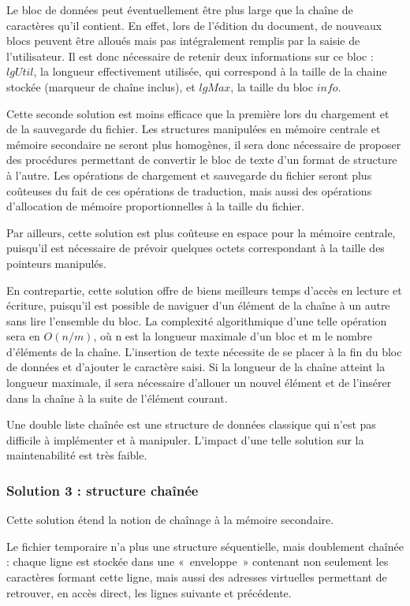 Le bloc de données peut éventuellement être plus large que la chaîne de
caractères qu'il contient. En effet, lors de l'édition du document, de nouveaux
blocs peuvent être alloués mais pas intégralement remplis par la saisie de
l'utilisateur. Il est donc nécessaire de retenir deux informations sur ce bloc
: $lgUtil$, la longueur effectivement utilisée, qui correspond à la taille de
la chaine stockée (marqueur de chaîne inclus),  et $lgMax$, la taille du bloc
$info$.

Cette seconde solution est moins efficace que la première lors du chargement et
de la sauvegarde du fichier. Les structures manipulées en mémoire centrale et
mémoire secondaire ne seront plus homogènes, il sera donc nécessaire de
proposer des procédures permettant de convertir le bloc de texte d'un format de
structure à l'autre. Les opérations de chargement et sauvegarde du fichier
seront plus coûteuses du fait de ces opérations de traduction, mais aussi des
opérations d'allocation de mémoire proportionnelles à la taille du fichier.

Par ailleurs, cette solution est plus coûteuse en espace pour la mémoire
centrale, puisqu'il est nécessaire de prévoir quelques octets correspondant à
la taille des pointeurs manipulés.

En contrepartie, cette solution offre de biens meilleurs temps d'accès en
lecture et écriture, puisqu'il est possible de naviguer d'un élément de la
chaîne à un autre sans lire l'ensemble du bloc. La complexité algorithmique
d'une telle opération sera en $O(n/m)$, où n est la longueur maximale d'un bloc
et m le nombre d'éléments de la chaîne. L'insertion de texte nécessite de se
placer à la fin du bloc de données et d'ajouter le caractère saisi. Si la
longueur de la chaîne atteint la longueur maximale, il sera nécessaire
d'allouer un nouvel élément et de l'insérer dans la chaîne à la suite de
l'élément courant.

Une double liste chaînée est une structure de données classique qui n'est pas
difficile à implémenter et à manipuler. L'impact d'une telle solution sur la
maintenabilité est très faible.

\subsubsection{Solution 3 : structure chaînée}
Cette solution étend la notion de chaînage à la mémoire secondaire.

Le fichier temporaire n'a plus une structure séquentielle, mais doublement chaînée : chaque ligne est stockée dans une «~enveloppe~» contenant non seulement les caractères formant cette ligne, mais aussi des adresses virtuelles permettant de retrouver, en accès direct, les lignes suivante et précédente.

